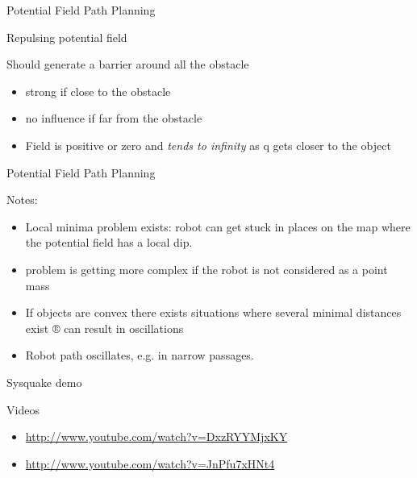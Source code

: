\documentclass[compress]{beamer}
\begin{document}
\begin{frame}{Potential Field Path Planning}

Repulsing potential field

Should generate a barrier around all the obstacle

\begin{itemize}
\item strong if close to the obstacle
\item no influence if far from the obstacle
\item Field is positive or zero and \emph{tends to infinity} as q gets
  closer to the object
\end{itemize}

\end{frame}

\begin{frame}{Potential Field Path Planning}

Notes:

\begin{itemize}
\item Local minima problem exists: robot can get stuck in places on the map
  where the potential field has a local dip.
\item problem is getting more complex if the robot is not considered as a
  point mass
\item If objects are convex there exists situations where several minimal
  distances exist ® can result in oscillations
\item Robot path oscillates, e.g. in narrow passages.
\end{itemize}

Sysquake demo

Videos

\begin{itemize}
\item \url{http://www.youtube.com/watch?v=DxzRYYMjxKY}
\item \url{http://www.youtube.com/watch?v=JnPfu7xHNt4}
\end{itemize}

\end{frame}
\end{document}
